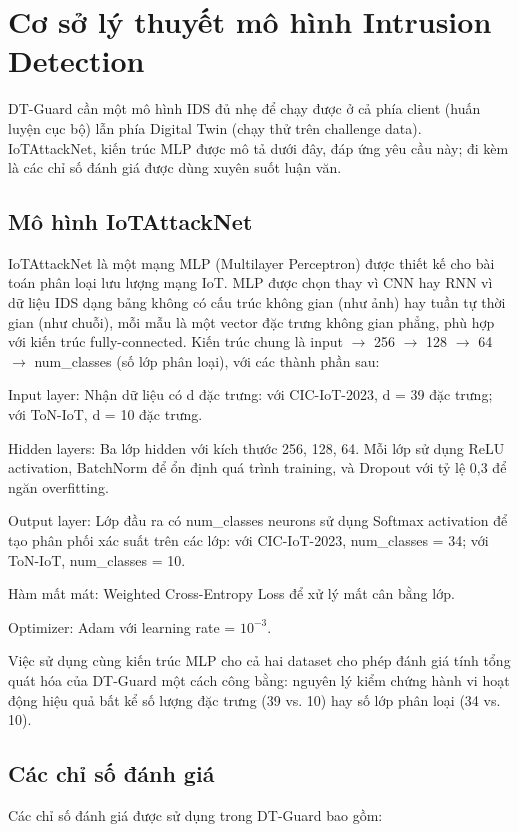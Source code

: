 \section{Cơ sở lý thuyết mô hình Intrusion Detection}
DT-Guard cần một mô hình IDS đủ nhẹ để chạy được ở cả phía client (huấn luyện cục bộ) lẫn phía Digital Twin (chạy thử trên challenge data). IoTAttackNet, kiến trúc MLP được mô tả dưới đây, đáp ứng yêu cầu này; đi kèm là các chỉ số đánh giá được dùng xuyên suốt luận văn.

\subsection{Mô hình IoTAttackNet}
IoTAttackNet là một mạng MLP (Multilayer Perceptron) được thiết kế cho bài toán phân loại lưu lượng mạng IoT. MLP được chọn thay vì CNN hay RNN vì dữ liệu IDS dạng bảng không có cấu trúc không gian (như ảnh) hay tuần tự thời gian (như chuỗi), mỗi mẫu là một vector đặc trưng không gian phẳng, phù hợp với kiến trúc fully-connected. Kiến trúc chung là input $\rightarrow$ 256 $\rightarrow$ 128 $\rightarrow$ 64 $\rightarrow$ num\_classes (số lớp phân loại), với các thành phần sau:

Input layer: Nhận dữ liệu có d đặc trưng: với CIC-IoT-2023, d = 39 đặc trưng; với ToN-IoT, d = 10 đặc trưng.

Hidden layers: Ba lớp hidden với kích thước 256, 128, 64. Mỗi lớp sử dụng ReLU activation, BatchNorm để ổn định quá trình training, và Dropout với tỷ lệ 0,3 để ngăn overfitting.

Output layer: Lớp đầu ra có num\_classes neurons sử dụng Softmax activation để tạo phân phối xác suất trên các lớp: với CIC-IoT-2023, num\_classes = 34; với ToN-IoT, num\_classes = 10.

Hàm mất mát: Weighted Cross-Entropy Loss để xử lý mất cân bằng lớp.

Optimizer: Adam với learning rate = $10^{-3}$.

Việc sử dụng cùng kiến trúc MLP cho cả hai dataset cho phép đánh giá tính tổng quát hóa của DT-Guard một cách công bằng: nguyên lý kiểm chứng hành vi hoạt động hiệu quả bất kể số lượng đặc trưng (39 vs. 10) hay số lớp phân loại (34 vs. 10).

\subsection{Các chỉ số đánh giá}
Các chỉ số đánh giá được sử dụng trong DT-Guard bao gồm:


